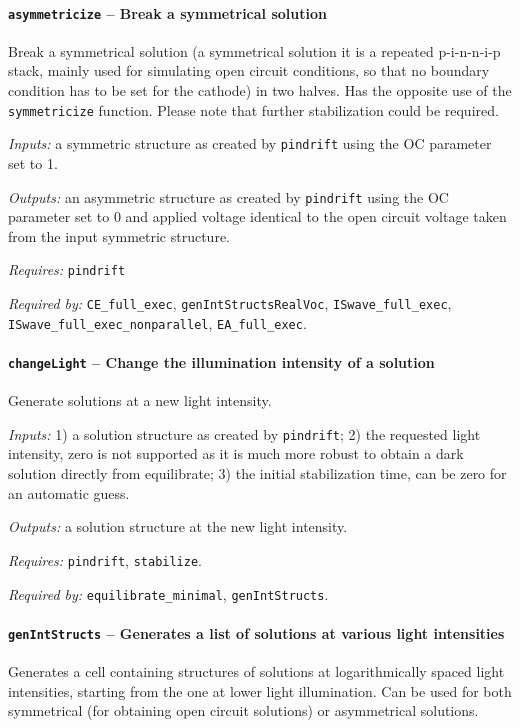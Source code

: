 		\paragraph{\texttt{asymmetricize} -- Break a symmetrical solution}\label{asymmetricize}
		Break a symmetrical solution (a symmetrical solution it is a repeated p-i-n-n-i-p stack, mainly used for simulating open circuit conditions, so that no boundary condition has to be set for the cathode) in two halves. Has the opposite use of the \texttt{symmetricize} function.
		Please note that further stabilization could be required.
		
		\textit{Inputs:} a symmetric structure as created by \texttt{pindrift} using the OC parameter set to 1.
		
		\textit{Outputs:} an asymmetric structure as created by \texttt{pindrift} using the OC
		     parameter set to 0 and applied voltage identical to the open circuit
		     voltage taken from the input symmetric structure.
		     
	\textit{Requires:} \texttt{pindrift}
	
	\textit{Required by:} \texttt{CE\_full\_exec}, \texttt{gen\-Int\-Structs\-Real\-Voc}, \texttt{ISwave\_full\_exec}, \texttt{ISwave\_full\_exec\_nonparallel}, \texttt{EA\_full\_exec}.

		\paragraph{\texttt{change\-Light} -- Change the illumination intensity of a solution}
		Generate solutions at a new light intensity.
		
		\textit{Inputs:} 1) a solution structure as created by \texttt{pindrift};
		2) the requested light intensity, zero is not supported as it is
		    much more robust to obtain a dark solution directly from equilibrate;
		3) the initial stabilization time, can be zero for an automatic
		     guess.
		     
		\textit{Outputs:} a solution structure at the new light intensity.
		
		\textit{Requires:} \texttt{pindrift}, \texttt{stabilize}.
		
			\textit{Required by:} \texttt{equilibrate\_minimal}, \texttt{gen\-Int\-Structs}.
			
		\paragraph{\texttt{gen\-Int\-Structs} -- Generates a list of solutions at various light intensities}\label{genIntStructs}
Generates a cell containing structures of solutions at logarithmically spaced light intensities, starting from the one at lower light illumination. Can be used for both symmetrical (for obtaining open circuit solutions) or asymmetrical solutions.

